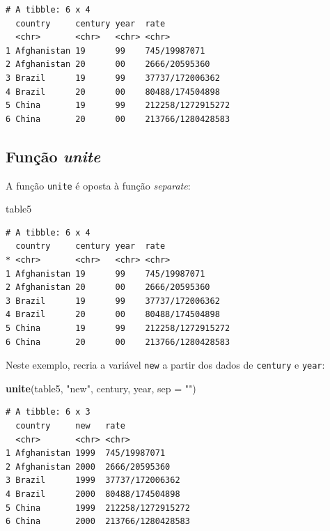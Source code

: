 \documentclass[12pt,brazil,oneside]{book}
\newenvironment{Shaded}{\begin{snugshade}}{\end{snugshade}}
\newcommand{\DataTypeTok}[1]{\textcolor[rgb]{0.13,0.29,0.53}{#1}}
\newcommand{\KeywordTok}[1]{\textcolor[rgb]{0.13,0.29,0.53}{\textbf{#1}}}
\newcommand{\NormalTok}[1]{#1}
\newcommand{\StringTok}[1]{\textcolor[rgb]{0.31,0.60,0.02}{#1}}
\begin{document}
\begin{verbatim}
# A tibble: 6 x 4
  country     century year  rate             
  <chr>       <chr>   <chr> <chr>            
1 Afghanistan 19      99    745/19987071     
2 Afghanistan 20      00    2666/20595360    
3 Brazil      19      99    37737/172006362  
4 Brazil      20      00    80488/174504898  
5 China       19      99    212258/1272915272
6 China       20      00    213766/1280428583
\end{verbatim}

\hypertarget{funcao-unite}{%
\subsection{\texorpdfstring{Função \emph{unite}}{Função unite}}\label{funcao-unite}}

A função \texttt{unite} é oposta à função \emph{separate}:

\begin{Shaded}
\begin{Highlighting}[]
\NormalTok{table5}
\end{Highlighting}
\end{Shaded}

\begin{verbatim}
# A tibble: 6 x 4
  country     century year  rate             
* <chr>       <chr>   <chr> <chr>            
1 Afghanistan 19      99    745/19987071     
2 Afghanistan 20      00    2666/20595360    
3 Brazil      19      99    37737/172006362  
4 Brazil      20      00    80488/174504898  
5 China       19      99    212258/1272915272
6 China       20      00    213766/1280428583
\end{verbatim}

Neste exemplo, recria a variável \texttt{new} a partir dos dados de \texttt{century} e \texttt{year}:

\begin{Shaded}
\begin{Highlighting}[]
\KeywordTok{unite}\NormalTok{(table5, }\StringTok{"new"}\NormalTok{, century, year, }\DataTypeTok{sep =} \StringTok{""}\NormalTok{)}
\end{Highlighting}
\end{Shaded}

\begin{verbatim}
# A tibble: 6 x 3
  country     new   rate             
  <chr>       <chr> <chr>            
1 Afghanistan 1999  745/19987071     
2 Afghanistan 2000  2666/20595360    
3 Brazil      1999  37737/172006362  
4 Brazil      2000  80488/174504898  
5 China       1999  212258/1272915272
6 China       2000  213766/1280428583
\end{verbatim}
\end{document}
